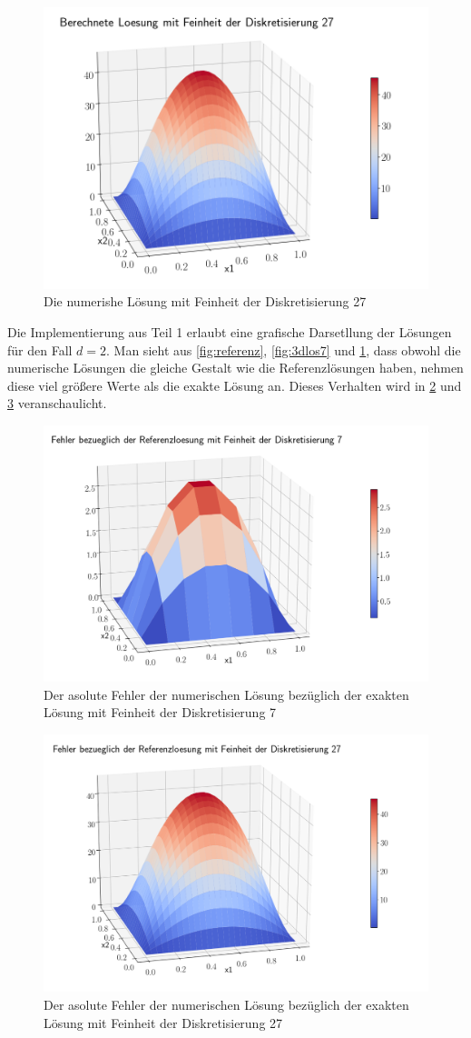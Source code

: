 \documentclass[smallheadings]{scrartcl}
\numberwithin{equation}{section}
\begin{document}
\begin{figure}
	\centering
	\includegraphics[width=0.7\linewidth]{Bericht/Bilder/3dlos27}
	\caption{Die numerishe Lösung mit Feinheit der Diskretisierung 27}
	\label{fig:3dlos27}
\end{figure}

Die Implementierung aus Teil 1 erlaubt eine grafische Darsetllung der Lösungen für den Fall $d=2$. Man sieht aus \ref{fig:referenz}, \ref{fig:3dlos7} und \ref{fig:3dlos27}, dass obwohl die numerische Lösungen die gleiche Gestalt wie die Referenzlösungen haben, nehmen diese viel größere Werte als die exakte Lösung an. Dieses Verhalten wird in \ref{fig:3dfel7} und \ref{fig:3dfel27} veranschaulicht. 

\begin{figure}
	\centering
	\includegraphics[width=0.7\linewidth]{Bericht/Bilder/3dfeh7}
	\caption{Der asolute Fehler der numerischen Lösung bezüglich der exakten Lösung mit Feinheit der Diskretisierung 7}
	\label{fig:3dfel7}
\end{figure}

\begin{figure}
	\centering
	\includegraphics[width=0.7\linewidth]{Bericht/Bilder/3dfel27}
	\caption{Der asolute Fehler der numerischen Lösung bezüglich der exakten Lösung mit Feinheit der Diskretisierung 27}
	\label{fig:3dfel27}
\end{figure}
\end{document}
